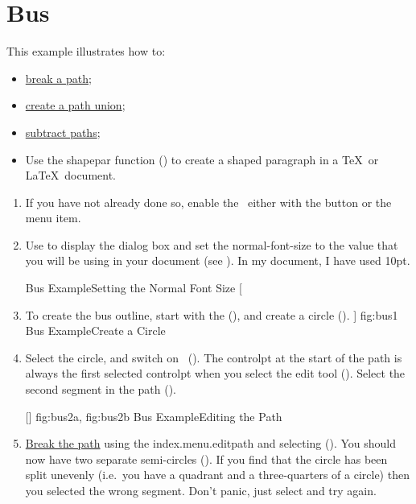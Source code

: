 \section{Bus}\label{sec:busexample}

This example illustrates how to:
\begin{itemize}
\item \hyperref[mi:breakpath]{break a path};
\item \hyperref[sec:pathunion]{create a path union};
\item \hyperref[sec:pathsubtract]{subtract paths};
\item Use the \gls{shapepar} function () to
create a shaped paragraph in a \TeX\ or \LaTeX\ document.
\end{itemize}

\begin{enumerate}
\item If you have not already done so, enable the \gridlock\ either
with the  button or the
 menu item.

\item Use  to display the
 dialog box and set the
\gls{normal-font-size} to the value that you will be using in your
document (see ). In my document, I have
used 10pt.

{}
{Bus Example\dash Setting the Normal Font Size}
[
  \item To create the bus outline, start with the
   (), and create a circle
  ().
]
{fig:bus1}
{}
{Bus Example\dash Create a Circle}

\item Select the circle, and switch on \editpathmode\
().  The \gls{controlpt} at the start of
the \gls{path} is always the first selected \gls{controlpt} when you
select the edit tool (\figureref{fig:bus2a}). Select the second
segment in the path ().

[]
{
 {fig:bus2a}{}{},
 {fig:bus2b}{}{}
}
{Bus Example\dash Editing the Path}

\item \hyperref[mi:breakpath]{Break the path} using the
\gls{index.menu.editpath} and selecting 
 ().  You should now have two
separate semi-circles (\figureref{fig:bus3b}).  If you find
that the circle has been split unevenly (i.e.\ you have a quadrant
and a three-quarters of a circle) then you selected the wrong
segment. Don't panic, just select  and try
again.


\end{enumerate}
